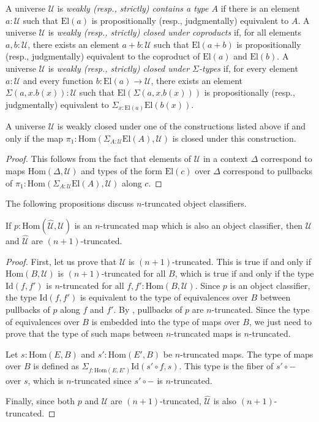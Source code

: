 \documentclass[reqno]{mscs}
\newcommand{\fs}[1]{\mathrm{#1}}
\newcommand{\Hom}{\fs{Hom}}
\newcommand{\Id}{\fs{Id}}
\newcommand{\El}{\fs{El}}
\numberwithin{figure}{section}
\begin{document}
A universe $\mathcal{U}$ is \emph{weakly (resp., strictly) contains a type $A$} if there is an element $a : \mathcal{U}$ such that $\El(a)$ is propositionally (resp., judgmentally) equivalent to $A$. 
A universe $\mathcal{U}$ is \emph{weakly (resp., strictly) closed under coproducts} if, for all elements $a,b : \mathcal{U}$, there exists an element $a + b : \mathcal{U}$ such that $\El(a + b)$ is propositionally (resp., judgmentally) equivalent to the coproduct of $\El(a)$ and $\El(b)$.
A universe $\mathcal{U}$ is \emph{weakly (resp., strictly) closed under $\Sigma$-types} if, for every element $a : \mathcal{U}$ and every function $b : \El(a) \to \mathcal{U}$, there exists an element $\Sigma(a,x.b(x)) : \mathcal{U}$ such that $\El(\Sigma(a,x.b(x)))$ is propositionally (resp., judgmentally) equivalent to $\Sigma_{x : \El(a)} \El(b(x))$.

\begin{prop}
A universe $\mathcal{U}$ is weakly closed under one of the constructions listed above if and only if the map $\pi_1 : \Hom(\Sigma_{A : \mathcal{U}} \El(A), \mathcal{U})$ is closed under this construction.
\end{prop}
\begin{proof}
This follows from the fact that elements of $\mathcal{U}$ in a context $\Delta$ correspond to maps $\Hom(\Delta, \mathcal{U})$ and
types of the form $\El(c)$ over $\Delta$ correspond to pullbacks of $\pi_1 : \Hom(\Sigma_{A : \mathcal{U}} \El(A), \mathcal{U})$ along $c$.
\end{proof}

The following propositions discuss $n$-truncated object classifiers.

\begin{prop}
If $p : \Hom(\widehat{\mathcal{U}},\mathcal{U})$ is an $n$-truncated map which is also an object classifier, then $\mathcal{U}$ and $\widehat{\mathcal{U}}$ are $(n+1)$-truncated.
\end{prop}
\begin{proof}
First, let us prove that $\mathcal{U}$ is $(n+1)$-truncated.
This is true if and only if $\Hom(B,\mathcal{U})$ is $(n+1)$-truncated for all $B$, which is true if and only if the type $\Id(f,f')$ is $n$-truncated for all $f,f' : \Hom(B,\mathcal{U})$.
Since $p$ is an object classifier, the type $\Id(f,f')$ is equivalent to the type of equivalences over $B$ between pullbacks of $p$ along $f$ and $f'$.
By , pullbacks of $p$ are $n$-truncated.
Since the type of equivalences over $B$ is embedded into the type of maps over $B$, we just need to prove that the type of such maps between $n$-truncated maps is $n$-truncated.

Let $s : \Hom(E,B)$ and $s' : \Hom(E',B)$ be $n$-truncated maps.
The type of maps over $B$ is defined as $\Sigma_{f : \Hom(E,E')} \Id(s' \circ f, s)$.
This type is the fiber of $s' \circ -$ over $s$, which is $n$-truncated since $s' \circ -$ is $n$-truncated.

Finally, since both $p$ and $\mathcal{U}$ are $(n+1)$-truncated, $\widehat{\mathcal{U}}$ is also $(n+1)$-truncated.
\end{proof}
\end{document}
